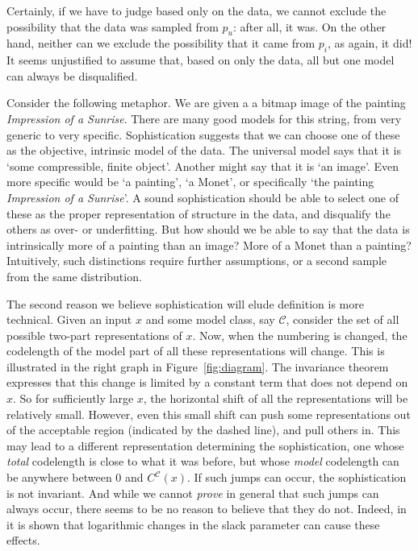 \documentclass{style/llncs}
\newcommand{\C}{\mathscr C}
\begin{document}
Certainly, if we have to judge based only on the data, we cannot exclude the possibility that the data was sampled from $p_u$: after all, it was.  On the other hand, neither can we exclude the possibility that it came from $p_i$, as again, it did! It seems unjustified to assume that, based on only the data, all but one model can always be disqualified.

Consider the following metaphor. We are given a a bitmap image of the painting \emph{Impression of a Sunrise}. There are many good models for this string, from very generic to very specific. Sophistication suggests that we can choose one of these as the objective, intrinsic model of the data. The universal model says that it is `some compressible, finite object'. Another might say that it is `an image'. Even more specific would be `a painting', `a Monet', or specifically `the painting \emph{Impression of a Sunrise}'. A sound sophistication should be able to select one of these as the proper representation of structure in the data, and disqualify the others as over- or underfitting. But how should we be able to say that the data is intrinsically more of a painting than an image? More of a Monet than a painting? Intuitively, such distinctions require further assumptions, or a second sample from the same distribution.

The second reason we believe sophistication will elude definition is more technical. Given an input $x$ and some model class, say $\C$, consider the set of all possible two-part representations of $x$. Now, when the numbering is changed, the codelength of the model part of all these representations will change. This is illustrated in the right graph in Figure~\ref{fig:diagram}. The invariance theorem expresses that this change is limited by a constant term that does not depend on $x$. So for sufficiently large $x$, the horizontal shift of all the representations will be relatively small. However, even this small shift can push some representations out of the acceptable region (indicated by the dashed line), and pull others in. This may lead to a different representation determining the sophistication, one whose \emph{total} codelength is close to what it was before, but whose \emph{model} codelength can be anywhere between $0$ and $C^\C(x)$. If such jumps can occur, the sophistication is not invariant. And while we cannot \emph{prove} in general that such jumps can always occur, there seems to be no reason to believe that they do not. Indeed, in \cite{antunes2013sophistication} it is shown that logarithmic changes in the slack parameter can cause these effects.
\end{document}
